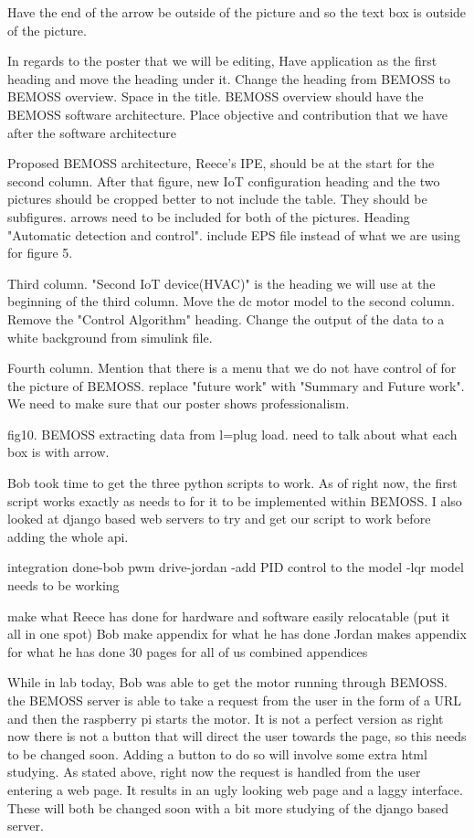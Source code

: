 \documentclass[fontsize=11pt, %
                             paper=letter, %
                             twoside, %
                             captions=tableheading,
                             index=totoc,
                             hyperref]{labbook}
\begin{document}
Have the end of the arrow be outside of the picture and so the text box is outside of the picture.

In regards to the poster that we will be editing, Have application as the first heading and move the heading under it. Change the heading from BEMOSS to BEMOSS overview. Space in the title. BEMOSS overview should have the BEMOSS software architecture. Place objective and contribution that we have after the software architecture

Proposed BEMOSS architecture, Reece's IPE,  should be at the start for the second column. After that figure, new IoT configuration heading and the two pictures should be cropped better to not include the table. They should be subfigures. arrows need to be included for both of the pictures. Heading "Automatic detection and control". include EPS file instead of what we are using for figure 5.

Third column. "Second IoT device(HVAC)" is the heading we will use at the beginning of the third column. Move the dc motor model to the second column. Remove the "Control Algorithm" heading. Change the output of the data to a white background from simulink file. 

Fourth column. Mention that there is a menu that we do not have control of for the picture of BEMOSS. replace "future work" with "Summary and Future work". We need to make sure that our poster shows professionalism.


fig10. BEMOSS extracting data from l=plug load. need to talk about what each box is with arrow.


Bob took time to get the three python scripts to work. As of right now, the first script works exactly as needs to for it to be implemented within BEMOSS. I also looked at django based web servers to try and get our script to work before adding the whole api.


integration done-bob
pwm drive-jordan 
    -add PID control to the model 
    -lqr model needs to be working 
    
make what Reece has done for hardware and software easily relocatable (put it all in one spot) 
Bob make appendix for what he has done
Jordan makes appendix for what he has done 
30 pages for all of us combined 
appendices 

While in lab today, Bob was able to get the motor running through BEMOSS. the BEMOSS server is able to take a request from the user in the form of a URL and then the raspberry pi starts the motor. It is not a perfect version as right now there is not a button that will direct the user towards the page, so this needs to be changed soon. Adding a button to do so will involve some extra html studying. 
As stated above, right now the request is handled from the user entering a web page. It results in an ugly looking web page and a laggy interface. These will both be changed soon with a bit more studying of the django based server.




\end{document}
